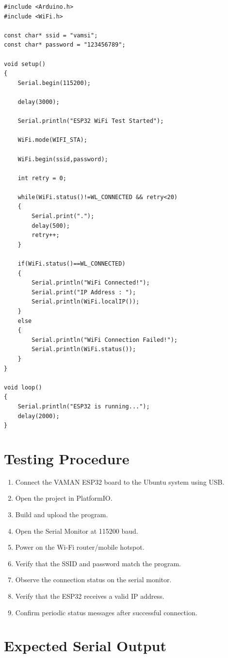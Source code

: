 \documentclass[12pt]{article}
\begin{document}
\begin{lstlisting}
#include <Arduino.h>
#include <WiFi.h>

const char* ssid = "vamsi";
const char* password = "123456789";

void setup()
{
    Serial.begin(115200);

    delay(3000);

    Serial.println("ESP32 WiFi Test Started");

    WiFi.mode(WIFI_STA);

    WiFi.begin(ssid,password);

    int retry = 0;

    while(WiFi.status()!=WL_CONNECTED && retry<20)
    {
        Serial.print(".");
        delay(500);
        retry++;
    }

    if(WiFi.status()==WL_CONNECTED)
    {
        Serial.println("WiFi Connected!");
        Serial.print("IP Address : ");
        Serial.println(WiFi.localIP());
    }
    else
    {
        Serial.println("WiFi Connection Failed!");
        Serial.println(WiFi.status());
    }
}

void loop()
{
    Serial.println("ESP32 is running...");
    delay(2000);
}
\end{lstlisting}

\section{Testing Procedure}

\begin{enumerate}
    \item Connect the VAMAN ESP32 board to the Ubuntu system using USB.
    \item Open the project in PlatformIO.
    \item Build and upload the program.
    \item Open the Serial Monitor at 115200 baud.
    \item Power on the Wi-Fi router/mobile hotspot.
    \item Verify that the SSID and password match the program.
    \item Observe the connection status on the serial monitor.
    \item Verify that the ESP32 receives a valid IP address.
    \item Confirm periodic status messages after successful connection.
\end{enumerate}

\section{Expected Serial Output}
\end{document}
